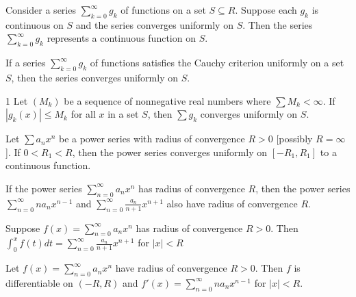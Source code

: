 \begin{theo}{1}
	Consider a series $\sum_{k=0}^{\infty}g_k$ of functions on a set $S \subseteq R$. Suppose each $g_k$ is continuous on $S$ and the series converges uniformly on $S$. Then the series $\sum_{k=0}^{\infty}g_k$ represents a continuous function on $S$.
\end{theo}

\begin{theo}{1}
	If a series	$\sum_{k=0}^{\infty}g_k$ of functions satisfies the Cauchy criterion uniformly on a set $S$, then the series converges uniformly on $S$.
\end{theo}

\begin{defn}{1}
	Let $(M_k)$ be a sequence of nonnegative real numbers where $\sum M_k < \infty$. If $|g_k(x)| \leq M_k$ for all $x$ in a set $S$, then $\sum g_k$ converges uniformly on $S$.
\end{defn}

\begin{defn}{1}
	Let $\sum a_n x^n$ be a power series with radius of convergence $R > 0$
	[possibly $R = \infty$]. If $0 < R_1 < R$, then the power series converges uniformly on $[−R_1 , R_1]$ to a continuous function.
\end{defn}

\begin{theo}{1}
	If the power series $\sum_{n=0}^{\infty}a_nx^n$ has radius of convergence $R$, then the power series $\sum_{n=0}^{\infty}na_nx^{n-1}$ and $\sum_{n=0}^{\infty}\frac{a_n}{n+1}x^{n+1}$	also have radius of convergence $R$.
\end{theo}

\begin{theo}{1}
	Suppose $f (x) = \sum_{n=0}^{\infty} a_n x^n$ has radius of convergence $R > 0$. Then $\int_{0}^{x}f(t)dt = \sum_{n=0}^{\infty}\frac{a_n}{n+1}x^{n+1}$ for $|x|<R$
\end{theo}

\begin{theo}{1}
	Let $f(x) = \sum_{n=0}^{\infty} a_n x^n$ have radius of convergence $R > 0$. Then $f$ is differentiable on $(−R, R)$ and $f'(x) = \sum_{n=0}^{\infty} na_nx^{n-1}$ for $|x|<R$.
\end{theo}

